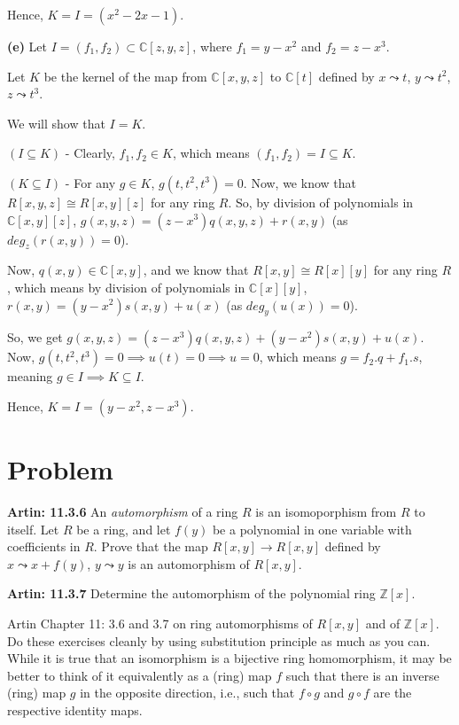 \documentclass[12pt,a4paper]{article}
\theoremstyle{definition}
\begin{document}
\begin{flushleft}
\medskip

Hence, $K = I = (x^2 -2x - 1)$.

\bigskip

{\bf (e)} Let $I = (f_1, f_2) \subset \mathbb{C}[z,y,z]$, where $f_1 = y - x^2$ and $f_2 = z - x^3$.

Let $K$ be the kernel of the map from $\mathbb{C}[x,y,z]$ to $\mathbb{C}[t]$ defined by $x \leadsto t$, $y \leadsto t^2$, $z \leadsto t^3$.

We will show that $I = K$.

\medskip

$(I \subseteq K)$ - Clearly, $f_1,f_2 \in K$, which means $(f_1,f_2) = I \subseteq K$.

\medskip

$(K \subseteq I)$ - For any $g \in K$, $g(t,t^2,t^3) = 0$. Now, we know that $R[x,y,z] \cong R[x,y][z]$ for any ring $R$. So, by division of polynomials in $\mathbb{C}[x,y][z]$, $g(x,y,z) = (z - x^3)q(x,y,z) + r(x,y)$ (as $deg_z (r(x,y)) = 0$). 

Now, $q(x,y) \in \mathbb{C}[x,y]$, and we know that $R[x,y] \cong R[x][y]$ for any ring $R$, which means by division of polynomials in $\mathbb{C}[x][y]$, $r(x,y) = (y-x^2)s(x,y) + u(x)$ (as $deg_y (u(x)) = 0$).

So, we get $g(x,y,z) = (z - x^3)q(x,y,z) + (y-x^2)s(x,y) + u(x)$. Now, $g(t,t^2,t^3) = 0 \implies u(t) = 0 \implies u = 0$, which means $g = f_2.q + f_1.s$, meaning $g \in I \implies K \subseteq I$.

\medskip

Hence, $K = I = (y-x^2,z-x^3)$.

\newpage

\setcounter{section}{5}
\section{Problem}

{\bf Artin: 11.3.6} An {\it automorphism} of a ring $R$ is an isomoporphism from $R$ to itself. Let $R$ be a ring, and let $f(y)$ be a polynomial in one variable with coefficients in $R$. Prove that the map $R[x,y] \to R[x,y]$ defined by $x\leadsto x + f(y)$, $y \leadsto y$ is an automorphism of $R[x,y]$.

\medskip

{\bf Artin: 11.3.7} Determine the automorphism of the polynomial ring $\mathbb{Z}[x]$.

\medskip

Artin Chapter 11: 3.6 and 3.7 on ring automorphisms of $R[x,y]$ and of $\mathbb{Z}[x]$. Do these exercises cleanly by using substitution principle as much as you can. While it is true that an isomorphism is a bijective ring homomorphism, it may be better to think of it equivalently as a (ring) map $f$ such that there is an inverse (ring) map $g$ in the opposite direction, i.e., such that  $f \circ g$ and $g \circ f$ are the respective identity maps.


\end{flushleft}
\end{document}
